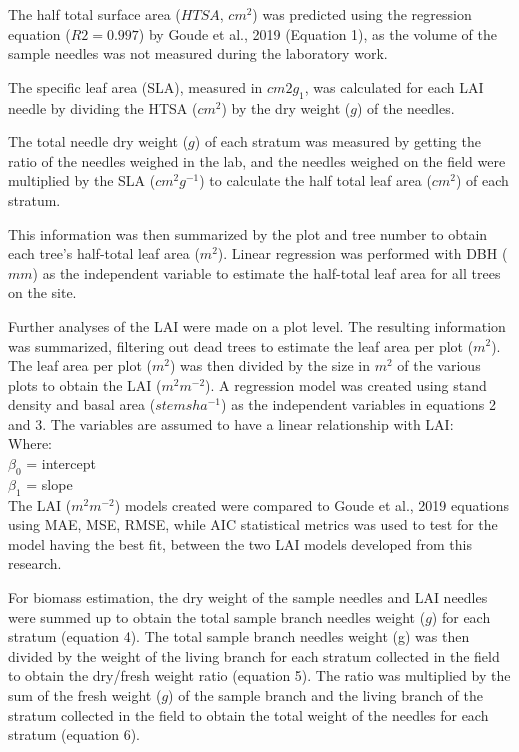 \documentclass[11pt, a4paper]{report}
\begin{document}
The half total surface area ($HTSA$, $cm^2$) was predicted using the regression equation ($R2 = 0.997$) by Goude et al., 2019 (Equation 1), as the volume of the sample needles was not measured during the laboratory work. 

The specific leaf area (SLA), measured in $cm2g_1$, was calculated for each LAI needle by dividing the HTSA ($cm^2$) by the dry weight ($g$) of the needles. 

The total needle dry weight ($g$) of each stratum was measured by getting the ratio of the needles weighed in the lab, and the needles weighed on the field were multiplied by the SLA ($cm^2g^{-1}$) to calculate the half total leaf area ($cm^2$) of each stratum.

This information was then summarized by the plot and tree number to obtain each tree’s half-total leaf area ($m^2$). Linear regression was performed with DBH ($mm$) as the independent variable to estimate the half-total leaf area for all trees on the site.

Further analyses of the LAI were made on a plot level. The resulting information
was summarized, filtering out dead trees to estimate the leaf area per plot ($m^2$). The
leaf area per plot ($m^2$) was then divided by the size in $m^2$ of the various plots to
obtain the LAI ($m^2m^{-2}$).
A regression model was created using stand density and basal area ($stemsha^{-1}$) as
the independent variables in equations 2 and 3. The variables are assumed to have a linear relationship with LAI:\\
Where:\\
$\beta_0$ = intercept\\
$\beta_1$ = slope\\
The LAI ($m^2m^{-2}$) models created were compared to Goude et al., 2019 equations using MAE, MSE, RMSE, while AIC statistical metrics was used to test for the model having the best fit, between the two LAI models developed from this research. 

For biomass estimation, the dry weight of the sample needles and LAI needles were summed up to obtain the total sample branch needles weight ($g$) for each stratum (equation 4). The total sample branch needles weight (g) was then divided by the weight of the living branch for each stratum collected in the field to obtain the dry/fresh weight ratio (equation 5). The ratio was multiplied by the sum of the fresh weight ($g$) of the sample branch and the living branch of the stratum collected in the field to obtain the total weight of the needles for each stratum (equation 6). 
\end{document}
